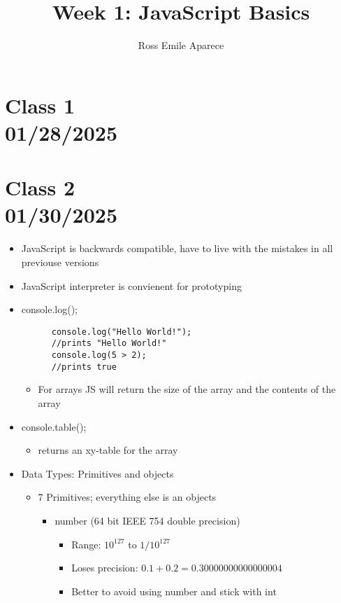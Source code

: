 \documentclass{article}
\title{Week 1: JavaScript Basics}
\date{}
\author{Ross Emile Aparece}
\begin{document}
\maketitle

\section*{Class 1 \\ 01/28/2025}\label{sec:Class 1}

\pagebreak
\section*{Class 2 \\ 01/30/2025}\label{sec:Class 2}
\begin{itemize}
  \item JavaScript is backwards compatible, have to live with the mistakes in all previouse versions
  \item JavaScript interpreter is convienent for prototyping
  \item console.log();
    \begin{lstlisting}
      console.log("Hello World!");
      //prints "Hello World!"
      console.log(5 > 2);
      //prints true
    \end{lstlisting}
    \begin{itemize}
      \item For arrays JS will return the size of the array and the contents of the array
    \end{itemize}
  \item console.table();
    \begin{itemize}
      \item returns an xy-table for the array
    \end{itemize}
  \item Data Types: Primitives and objects
    \begin{itemize}
      \item 7 Primitives; everything else is an objects
      \begin{itemize}
        \item number (64 bit IEEE 754 double precision)
        \begin{itemize}
          \item Range: \(10^{127}\) to \(1/10^{127}\)
          \item Loses precision: \(0.1 + 0.2 = 0.30000000000000004\)
          \item Better to avoid using number and stick with int

\end{itemize}
\end{itemize}
\end{itemize}
\end{itemize}
\end{document}
